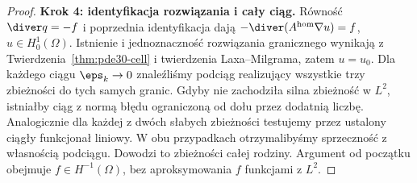 \begin{proof}
\textbf{Krok 4: identyfikacja rozwiązania i cały ciąg.}
Równość $\diver q=-f$ i poprzednia identyfikacja dają
$-\diver(A^{\mathrm{hom}}\nabla u)=f$, $u\in H_0^1(\Omega)$.
Istnienie i jednoznaczność rozwiązania granicznego
wynikają z Twierdzenia~\ref{thm:pde30-cell}
i twierdzenia Laxa--Milgrama, zatem $u=u_0$.
Dla każdego ciągu $\eps_k\to0$ znaleźliśmy
podciąg realizujący wszystkie trzy zbieżności
do tych samych granic. Gdyby nie zachodziła
silna zbieżność w $L^2$, istniałby ciąg z normą
błędu ograniczoną od dołu przez dodatnią liczbę.
Analogicznie dla każdej z dwóch słabych zbieżności
testujemy przez ustalony ciągły funkcjonał liniowy.
W obu przypadkach otrzymalibyśmy sprzeczność
z własnością podciągu. Dowodzi to zbieżności całej
rodziny. Argument od początku obejmuje
$f\in H^{-1}(\Omega)$, bez aproksymowania $f$
funkcjami z $L^2$.
\end{proof}


